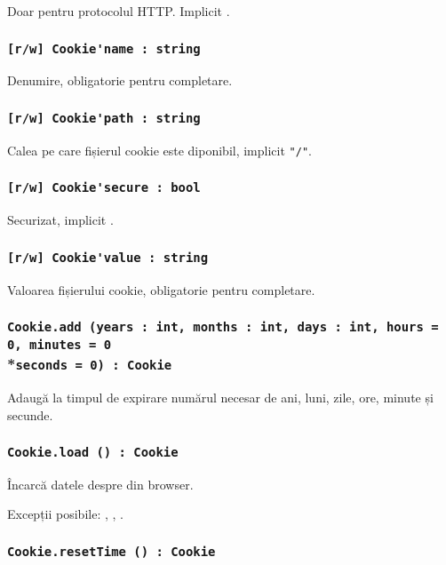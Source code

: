 Doar pentru protocolul HTTP. Implicit \false.

\subsubsection{\lstinline|[r/w] Cookie'name : string|}

Denumire, obligatorie pentru completare.

\subsubsection{\lstinline|[r/w] Cookie'path : string|}

Calea pe care fișierul cookie este diponibil, implicit \lstinline|"/"|.

\subsubsection{\lstinline|[r/w] Cookie'secure : bool|}

Securizat, implicit \false.

\subsubsection{\lstinline|[r/w] Cookie'value : string|}

Valoarea fișierului cookie, obligatorie pentru completare.

\subsubsection{\lstinline|Cookie.add (years : int, months : int, days : int, hours = 0, minutes = 0|\\*\noindent\lstinline|seconds = 0) : Cookie|}

Adaugă la timpul de expirare numărul necesar de ani, luni, zile, ore, minute și secunde.

\subsubsection{\lstinline|Cookie.load () : Cookie|}

Încarcă datele despre \cookie din browser.

Excepții posibile: , , .

\subsubsection{\lstinline|Cookie.resetTime () : Cookie|}

